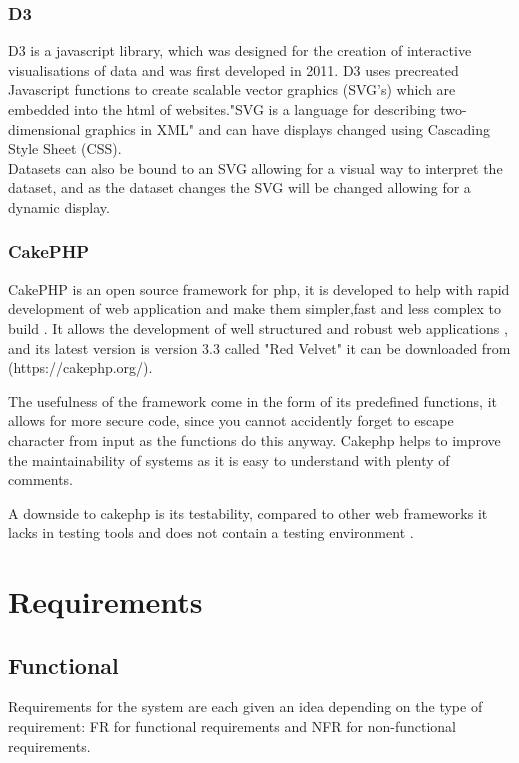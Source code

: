 \documentclass[12pt]{article}  %
\begin{document}
\subsubsection{D3}
D3 \cite{bostock_d3.js_????} is a javascript library, which was designed for the creation of interactive visualisations of data and was first developed in 2011. D3 uses precreated Javascript functions to create scalable vector graphics (SVG's) which are embedded into the html of websites."SVG is a language for describing two-dimensional graphics in XML"\cite{ferraiolo_scalable_2000} and can have displays changed  using Cascading Style Sheet (CSS).  \\
Datasets can also be bound to an SVG allowing for a visual way to interpret the dataset, and as the dataset changes the SVG will be changed allowing for a dynamic display.

\subsubsection{CakePHP}
CakePHP is an open source framework for php, it is developed to help with rapid development of web application and make them simpler,fast and less complex to build \cite{_cakephp_????}. It allows the development of well structured and robust web applications \cite{plekhanova_evaluating_2009}, and its latest version is version 3.3 called "Red Velvet" it can be downloaded from (https://cakephp.org/).

The usefulness of the framework come in the form of its predefined functions, it allows for more secure code, since you cannot accidently forget to escape character from input as the functions do this anyway. Cakephp helps to improve the maintainability of systems as it is easy to understand with plenty of comments.

A downside to cakephp is its testability, compared to other web frameworks it lacks in testing tools and does not contain a testing environment \cite{plekhanova_evaluating_2009}.



\newpage
\section{Requirements}
\label{section:require}
 


\subsection{Functional}
Requirements for the system are each given an idea depending on the type of requirement: FR for functional requirements and NFR for non-functional requirements.
\end{document}

